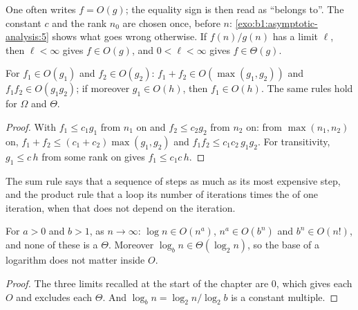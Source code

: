 One often writes $f = O(g)$; the equality sign is then read as ``belongs to''. The constant $c$ and the rank $n_0$ are
chosen once, before $n$: \cref{exo:b1:asymptotic-analysis:5} shows what goes wrong otherwise. If $f(n)/g(n)$ has a
limit $\ell$, then $\ell < \infty$ gives $f \in O(g)$, and $0 < \ell < \infty$ gives $f \in \Theta(g)$.

\begin{proposition}\label{prop:b1:asymptotic-analysis:rules}
For  $f_1 \in O(g_1)$ and $f_2 \in O(g_2)$: $f_1 + f_2 \in O(\max(g_1, g_2))$ and $f_1 f_2 \in O(g_1
g_2)$; if moreover $g_1 \in O(h)$, then $f_1 \in O(h)$. The same rules hold for $\Omega$ and $\Theta$.
\end{proposition}

\begin{proof}
With $f_1 \leq c_1 g_1$ from $n_1$ on and $f_2 \leq c_2 g_2$ from $n_2$ on: from $\max(n_1, n_2)$ on, $f_1 + f_2 \leq
(c_1 + c_2) \max(g_1, g_2)$ and $f_1 f_2 \leq c_1 c_2\, g_1 g_2$. For transitivity, $g_1 \leq c\,h$ from some rank on
gives $f_1 \leq c_1 c\, h$.
\end{proof}

The sum rule says that a sequence of steps  as much as its most expensive step, and the product rule that a
loop  its number of iterations times the  of one iteration, when that  does not depend on the iteration.

\begin{proposition}\label{prop:b1:asymptotic-analysis:scale}
For $a > 0$ and $b > 1$, as $n \to \infty$: $\log n \in O(n^a)$, $n^a \in O(b^n)$ and $b^n \in O(n!)$, and none of these
is a $\Theta$. Moreover $\log_b n \in \Theta(\log_2 n)$, so the base of a logarithm does not matter inside $O$.
\end{proposition}

\begin{proof}
The three limits recalled at the start of the chapter are 0, which gives each $O$ and excludes each $\Theta$. And
$\log_b n = \log_2 n / \log_2 b$ is a constant multiple.
\end{proof}

\label{out:b1:asymptotic-analysis:growth}


